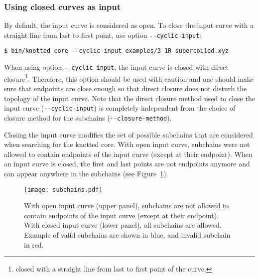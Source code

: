 \subsubsection{Using closed curves as input}
By default, the input curve is considered as open. To close the input curve with a straight line from last to first point, use option \lstinline{--cyclic-input}:
\begin{lstlisting}
$ bin/knotted_core --cyclic-input examples/3_1R_supercoiled.xyz
\end{lstlisting}
When using option \lstinline{--cyclic-input}, the input curve is closed with direct closure\footnote{closed with a straight line from last to first point of the curve.}. Therefore, this option should be used with caution and one should make sure that endpoints are close enough so that direct closure does not disturb the topology of the input curve. Note that the direct closure method used to close the input curve (\lstinline{--cyclic-input}) is completely independent from the choice of closure method for the subchains (\lstinline{--closure-method}).

Closing the input curve modifies the set of possible subchains that are considered when searching for the knotted core.
With open input curve, subchains were not allowed to contain endpoints of the input curve (except at their endpoint).
When an input curve is closed, the first and last points are not endpoints anymore and can appear anywhere in the subchains (see Figure~\ref{fig:subchains}).
\begin{figure}[t]
\centering
\texttt{[image: subchains.pdf]}
\caption{With open input curve (upper panel), subchains are not allowed to contain endpoints of the input curve (except at their endpoint). With closed input curve (lower panel), all subchains are allowed. Example of valid subchains are shown in blue, and invalid subchain in red. }\label{fig:subchains}
\end{figure}

